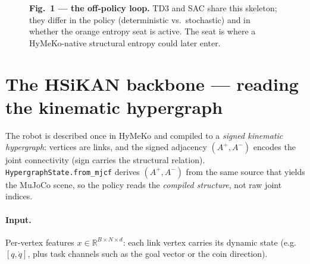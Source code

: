 \documentclass[11pt]{article}
\newcommand{\code}[1]{\texttt{\small #1}}
\begin{document}
\begin{figure}[h]\centering
{}
\caption*{\small\textbf{Fig.~1 — the off-policy loop.} TD3 and SAC share this skeleton; they differ in the
policy (deterministic vs.\ stochastic) and in whether the orange entropy seat is active. The seat is where a
HyMeKo-native structural entropy could later enter.}
\end{figure}

\section{The HSiKAN backbone --- reading the kinematic hypergraph}
The robot is described once in HyMeKo and compiled to a \emph{signed kinematic hypergraph}: vertices are links,
and the signed adjacency $(A^+,A^-)$ encodes the joint connectivity (sign carries the structural relation).
\code{HypergraphState.from\_mjcf} derives $(A^+,A^-)$ from the same source that yields the MuJoCo scene, so the
policy reads the \emph{compiled structure}, not raw joint indices.

\paragraph{Input.} Per-vertex features $x\in\mathbb R^{B\times N\times d}$: each link vertex carries its
dynamic state (e.g.\ $[q,\dot q]$, plus task channels such as the goal vector or the coin direction).
\end{document}

